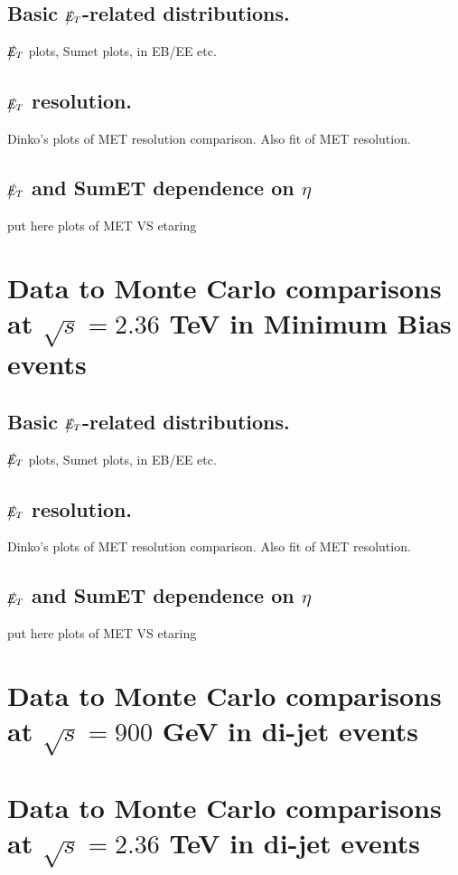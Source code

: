 \documentclass{cmspaper}
\def\etmiss{\big\slash\hspace{-1.6ex}{E_T}}
\begin{document}
\subsection{Basic $\etmiss$-related distributions.}
$\etmiss$ plots, Sumet plots, in EB/EE etc.

\subsection{$\etmiss$ resolution.}
Dinko's plots of MET resolution comparison. Also fit of MET resolution.

\subsection{$\etmiss$ and SumET dependence on $\eta$}
put here plots of MET VS etaring

\section{Data to Monte Carlo comparisons at $\sqrt{s}=2.36$ TeV in
  Minimum Bias events}


\subsection{Basic $\etmiss$-related distributions.}
$\etmiss$ plots, Sumet plots, in EB/EE etc.

\subsection{$\etmiss$ resolution.}
Dinko's plots of MET resolution comparison. Also fit of MET resolution.

\subsection{$\etmiss$ and SumET dependence on $\eta$}
put here plots of MET VS etaring

\section{Data to Monte Carlo comparisons at $\sqrt{s}=900$ GeV in di-jet events} 

\section{Data to Monte Carlo comparisons at $\sqrt{s}=2.36$ TeV in di-jet events} 
\end{document}
